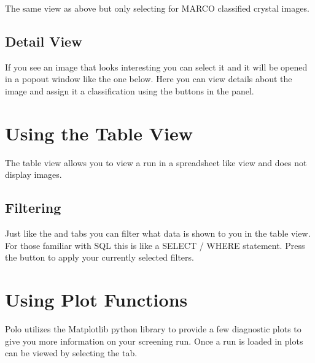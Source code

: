\documentclass[letterpaper,10pt,english]{sphinxmanual}
\begin{document}
The same view as above but only selecting for MARCO classified crystal images.
\begin{quote}

\noindent{}
\end{quote}


\subsection{Detail View}
\label{\detokenize{user_guide:detail-view}}
If you see an image that looks interesting you can select it and it will be
opened in a popout window like the one below. Here you can view details about
the image and assign it a classification using the buttons in the 
panel.
\begin{quote}

\noindent{}
\end{quote}


\section{Using the Table View}
\label{\detokenize{user_guide:using-the-table-view}}
The table view allows you to view a run in a spreadsheet like view and does
not display images.
\begin{quote}

\noindent{}
\end{quote}


\subsection{Filtering}
\label{\detokenize{user_guide:id1}}
Just like the  and  tabs you can filter
what data is shown to you in the table view. For those familiar with SQL this
is like a SELECT / WHERE statement. Press the  button to
apply your currently selected filters.
\begin{quote}

\noindent{}
\end{quote}


\section{Using Plot Functions}
\label{\detokenize{user_guide:using-plot-functions}}
Polo utilizes the Matplotlib python library to provide a few diagnostic
plots to give you more information on your screening run. Once a run is loaded
in plots can be viewed by selecting the  tab.
\end{document}
